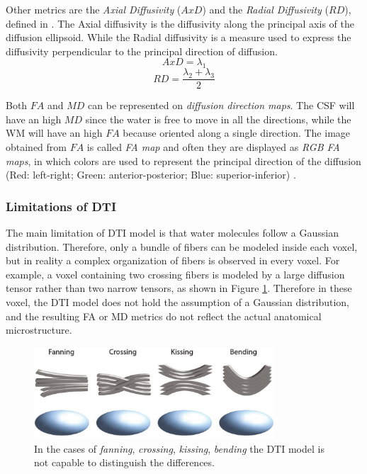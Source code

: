  Other metrics are the \emph{Axial Diffusivity} ($AxD$) and the \emph{Radial Diffusivity} ($RD$), defined in \cite{dtiBook}. The Axial diffusivity is the diffusivity along the principal axis of the diffusion ellipsoid. While the Radial diffusivity is a measure used to express the diffusivity perpendicular to the principal direction of diffusion.
 \begin{equation}
    AxD = \lambda_1
 \end{equation}
 \begin{equation}
    RD = \frac{\lambda_2+\lambda_3}{2}
 \end{equation}

 Both $FA$ and $MD$ can be represented on \emph{diffusion direction maps}. The CSF will have an high $MD$ since the water is free to move in all the directions, while the WM will have an high $FA$ because oriented along a single direction. The image obtained from $FA$ is called \emph{FA map} and often they are displayed as \emph{RGB FA maps}, in which colors are used to represent the principal direction of the diffusion (Red: left-right; Green: anterior-posterior; Blue: superior-inferior) .

  \subsubsection*{Limitations of DTI}\label{section:dti_limitations}
  The main limitation of DTI model is that water molecules follow a Gaussian distribution. Therefore, only a bundle of fibers can be modeled inside each voxel, but in reality a complex organization of fibers is observed in every voxel. For example, a voxel containing two crossing fibers is modeled by a large diffusion tensor rather than two narrow tensors, as shown in Figure \ref{fig:fiber_crossing}. Therefore in these voxel, the DTI model does not hold the assumption of a Gaussian distribution, and the resulting FA or MD metrics do not reflect the actual anatomical microstructure. \cite{elementiRisonanza}

  \begin{figure}[h]
      \centering
      \includegraphics[width=0.8\textwidth]{images/fiber_orientations.png}
      \caption{In the cases of \emph{fanning}, \emph{crossing}, \emph{kissing}, \emph{bending} the DTI model is not capable to distinguish the differences. \cite{elementiRisonanza}}
      \label{fig:fiber_crossing}
  \end{figure}
